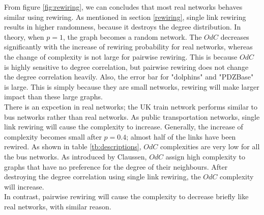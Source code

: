 \documentclass[12pt]{article}
\begin{document}
\noindent
From figure \ref{fig:rewiring}, we can concludes that most real networks behaves similar using rewiring. As mentioned in section \ref{rewiring}, single link rewiring results in higher randomness, because it destroys the degree distribution. In theory, when $p=1$, the graph becomes a random network. The $OdC$ decreases significantly with the increase of rewiring probability for real networks, whereas the change of complexity is not large for pairwise rewiring. This is because $OdC$ is highly sensitive to degree correlation, but pairwise rewiring does not change the degree correlation heavily. Also, the error bar for "dolphins" and "PDZBase" is large. This is simply because they are small networks, rewiring will make larger impact than these large graphs.\\
There is an expcetion in real networks; the UK train network performs similar to bus networks rather than real networks. As public transportation networks, single link rewiring will cause the complexity to increase. Generally, the increase of complexity becomes small after $p=0.4$; almost half of the links have been rewired. As shown in table \ref{tb:descriptions}, $OdC$ complexities are very low for all the bus networks. As introduced by Claussen\cite{odc}, $OdC$ assign high complexity to graphs that have no preference for the degree of their neighbours. After destroying the degree correlation using single link rewiring, the $OdC$ complexity will increase.\\
In contrast, pairwise rewiring will cause the complexity to decrease briefly like real networks, with similar reason.

\clearpage
\end{document}

